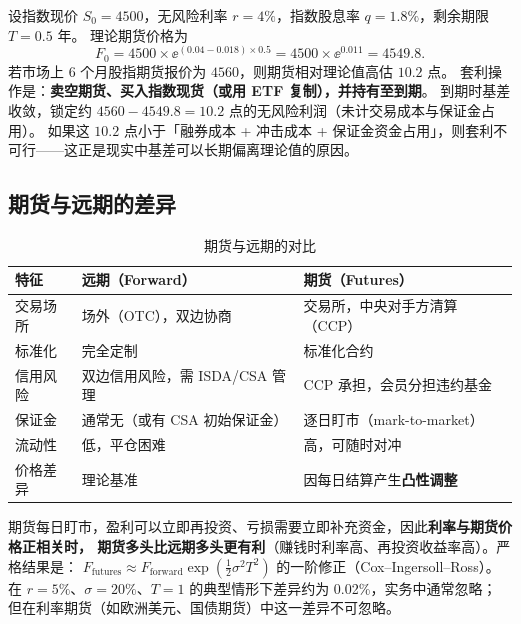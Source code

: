\begin{example}[股指期货定价与套利检验]\label{ex:04-forward}
设指数现价 $S_0 = 4500$，无风险利率 $r = 4\%$，指数股息率 $q = 1.8\%$，剩余期限 $T = 0.5$ 年。
理论期货价格为
\[
  F_0 = 4500\times \ee^{(0.04-0.018)\times 0.5} = 4500\times \ee^{0.011} = 4549.8.
\]
若市场上 6 个月股指期货报价为 $4560$，则期货相对理论值高估 $10.2$ 点。
套利操作是：\textbf{卖空期货、买入指数现货（或用 ETF 复制），并持有至到期}。
到期时基差收敛，锁定约 $4560 - 4549.8 = 10.2$ 点的无风险利润（未计交易成本与保证金占用）。
如果这 $10.2$ 点小于「融券成本 + 冲击成本 + 保证金资金占用」，则套利不可行——这正是现实中基差可以长期偏离理论值的原因。
\end{example}

\subsection{期货与远期的差异}

\begin{table}[htbp]
\centering
\caption{期货与远期的对比}\label{tab:04-futures}
\tablefont
\begin{tabular}{@{}L{2.2cm}L{5.4cm}L{6.0cm}@{}}
\toprule
特征 & 远期（Forward） & 期货（Futures） \\
\midrule
交易场所 & 场外（OTC），双边协商 & 交易所，中央对手方清算（CCP） \\
标准化 & 完全定制 & 标准化合约 \\
信用风险 & 双边信用风险，需 ISDA/CSA 管理 & CCP 承担，会员分担违约基金 \\
保证金 & 通常无（或有 CSA 初始保证金） & 逐日盯市（mark-to-market） \\
流动性 & 低，平仓困难 & 高，可随时对冲 \\
价格差异 & 理论基准 & 因每日结算产生\textbf{凸性调整} \\
\bottomrule
\end{tabular}
\end{table}

\begin{notebox}[期货价格与远期价格为何略有不同]
期货每日盯市，盈利可以立即再投资、亏损需要立即补充资金，因此\textbf{利率与期货价格正相关时，
期货多头比远期多头更有利}（赚钱时利率高、再投资收益率高）。严格结果是：
$F_{\text{futures}} \approx F_{\text{forward}}\exp\!\left(\tfrac12\sigma^2T^2\right)$ 的一阶修正（Cox--Ingersoll--Ross）。
在 $r=5\%$、$\sigma=20\%$、$T=1$ 的典型情形下差异约为 0.02\%，实务中通常忽略；
但在利率期货（如欧洲美元、国债期货）中这一差异不可忽略。
\end{notebox}

